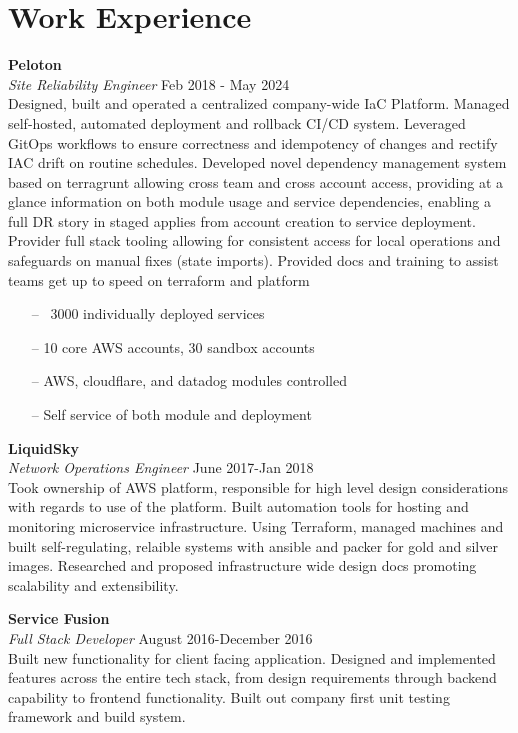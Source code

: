 \section{Work Experience}

\large{\textbf{Peloton}} \\
\textit{Site Reliability Engineer} \hfill Feb 2018 - May 2024 \\[3.75pt]
Designed, built and operated a centralized company-wide IaC Platform. Managed self-hosted, automated deployment and rollback CI/CD system. Leveraged GitOps workflows to ensure correctness and idempotency of changes and rectify IAC drift on routine schedules. Developed novel dependency management system based on terragrunt allowing cross team and cross account access, providing at a glance information on both module usage and service dependencies, enabling a full DR story in staged applies from account creation to service deployment. Provider full stack tooling allowing for consistent access for local operations and safeguards on manual fixes (state imports). Provided docs and training to assist teams get up to speed on terraform and platform


\begin{minipage}[t]{\linewidth}
    \begin{itemize}
        \item[--] ~3000 individually deployed services
        \item[--] 10 core AWS accounts, 30 sandbox accounts
        \item[--] AWS, cloudflare, and datadog modules controlled
        \item[--] Self service of both module and deployment
    \end{itemize}
    \end{minipage}

\large{\textbf{LiquidSky}} \\
\textit{Network Operations Engineer} \hfill June 2017-Jan 2018 \\[3.75pt]
Took ownership of AWS platform, responsible for high level design considerations with regards to use of the platform. Built automation tools for hosting and monitoring microservice infrastructure. Using Terraform, managed machines and built self-regulating, relaible systems with ansible and packer for gold and silver images. Researched and proposed infrastructure wide design docs promoting scalability and extensibility.

\large{\textbf{Service Fusion}} \\
\textit{Full Stack Developer} \hfill August 2016-December 2016 \\[3.75pt]
Built new functionality for client facing application. Designed and implemented features across the entire tech stack, from design requirements through backend capability to frontend functionality. Built out company first unit testing framework and build system.

